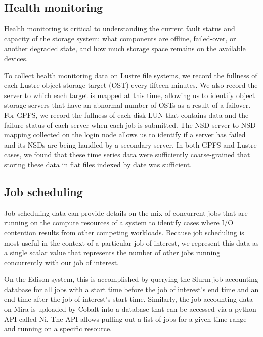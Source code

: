 \subsection{Health monitoring} \label{sec:methods/health}

Health monitoring is critical to understanding the current fault status and capacity of the
storage system: what components are offline, failed-over, or another degraded state, and how much storage space remains on the available devices.

To collect health monitoring data on Lustre file systems, we record the fullness of each Lustre object storage target (OST) every fifteen minutes.
We also record the server to which each target is mapped at this time, allowing us to identify object storage servers that have an abnormal number of OSTs as a result of a failover.
For GPFS, we record the fullness of each disk LUN that contains data and the failure status of each server when each job is submitted.
The NSD server to NSD mapping collected on the login node allows us to identify if a server has failed and its NSDs are being handled by a secondary server.
In both GPFS and Lustre cases, we found that these time series data were sufficiently coarse-grained that storing these data in flat files indexed by date was sufficient.

\subsection{Job scheduling} \label{sec:methods/scheduling}

Job scheduling data can provide details on the mix of concurrent jobs that are running on the compute resources of a system to identify cases where I/O contention results from other competing workloads.
Because job scheduling is most useful in the context of a particular job of interest, we represent this data as a single scalar value that represents the number of other jobs running concurrently with our job of interest.

On the Edison system, this is accomplished by querying the Slurm job accounting database for all jobs with a start time before the job of interest's end time and an end time after the job of interest's start time.
Similarly, the job accounting data on Mira is uploaded by Cobalt into a database that can be accessed via a python API called Ni.
The API allows pulling out a list of jobs for a given time range and running on a specific resource.

